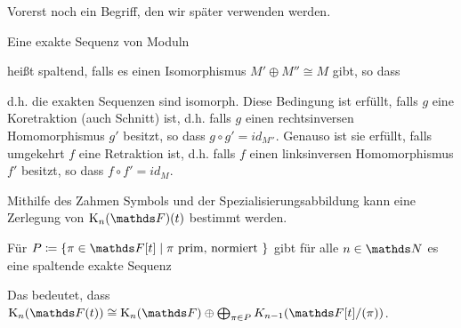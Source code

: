 \documentclass[ngerman,fontsize=11pt, paper=a4, parskip=half, titlepage=true, toc=bib]{scrartcl}
\begin{document}
Vorerst noch ein Begriff, den wir später verwenden werden.
\begin{Def}\label{spaltendeexaktesequenz}
  Eine exakte Sequenz von Moduln
  \begin{center}
 \end{center}
 heißt spaltend, falls es einen Isomorphismus $M'\oplus M''\cong M$
 gibt, so dass
 \begin{center}
 \end{center}
 d.h. die exakten Sequenzen sind isomorph.
 Diese Bedingung ist erfüllt, falls $g$ eine
 Koretraktion (auch Schnitt) ist, 
 d.h. falls $g$ einen rechtsinversen Homomorphismus
 $g'$ besitzt, so dass $g\circ g'=id_{M''}$.
 Genauso ist sie erfüllt, falls umgekehrt $f$ eine Retraktion ist,
 d.h. falls $f$ einen linksinversen Homomorphismus 
 $f'$ besitzt, so dass $f\circ f'=id_{M}$.
\end{Def}

Mithilfe des Zahmen Symbols und der Spezialisierungsabbildung kann
eine Zerlegung von $\KnF(t)$ bestimmt werden.

\begin{Satz}[Milnor]\label{milnorfolge}
  Für $P\coloneqq \{\pi\in \F[t]\mid \pi\text{ prim, normiert }\}$
  gibt für alle $n\in\N$ es eine spaltende exakte Sequenz
  \begin{center}
  \end{center}
 Das bedeutet, dass 
  $\K_n(\Ft )\cong\KnF\oplus\bigoplus_{\pi\in P}K_{n-1}(\F[t]/(\pi))$.
\end{Satz}
\end{document}
